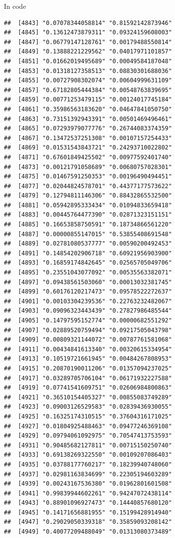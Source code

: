 \documentclass[ignorenonframetext,]{beamer}
\begin{document}
\begin{frame}[fragile]{In code}
\begin{verbatim}
##  [4843] "0.07078344058814" "0.81592142873946"
##  [4845] "0.13612473879311" "0.09324159608003"
##  [4847] "0.06779147128761" "0.00179488550814"
##  [4849] "0.13888221229562" "0.04017971101857"
##  [4851] "0.01662019495689" "0.00049584187048"
##  [4853] "0.01318127358513" "0.08830301688036"
##  [4855] "0.00727908302074" "0.00604999631109"
##  [4857] "0.67182805444384" "0.00548763839695"
##  [4859] "0.00771253479115" "0.00124017745184"
##  [4861] "0.35986563183620" "0.04647841050750"
##  [4863] "0.73151392943391" "0.00501469496461"
##  [4865] "0.07293979077776" "0.26744083374359"
##  [4867] "0.13472537251308" "0.00107157254433"
##  [4869] "0.01531543843721" "0.24293710022802"
##  [4871] "0.67601849425502" "0.00977592401740"
##  [4873] "0.00121791058689" "0.00680757028301"
##  [4875] "0.01467591250353" "0.00196490494451"
##  [4877] "0.02044824578701" "0.44377177573622"
##  [4879] "0.12794811146306" "0.88432865532500"
##  [4881] "0.05942895333434" "0.01094833659418"
##  [4883] "0.00445764477390" "0.02871323151151"
##  [4885] "0.16653858750591" "0.18734866561220"
##  [4887] "0.00000855147015" "0.53855408691548"
##  [4889] "0.02781080537777" "0.00590200492453"
##  [4891] "0.14854202906718" "0.60921956903900"
##  [4893] "0.16859174842645" "0.02565705049706"
##  [4895] "0.23551043077092" "0.00535563382071"
##  [4897] "0.09438561503060" "0.00013032381745"
##  [4899] "0.60176120217473" "0.09578522272637"
##  [4901] "0.00103304239536" "0.22763232482067"
##  [4903] "0.09096323443439" "0.27827986485544"
##  [4905] "0.14797595152774" "0.00000682551292"
##  [4907] "0.02889520759494" "0.09217505043798"
##  [4909] "0.00809321144072" "0.00787761581068"
##  [4911] "0.00434841613340" "0.00320615334954"
##  [4913] "0.10519721661945" "0.00484267808953"
##  [4915] "0.20870190011206" "0.01357094237025"
##  [4917] "0.03289705706104" "0.06171932227588"
##  [4919] "0.07741541609751" "0.02606984800863"
##  [4921] "0.36510154405327" "0.00855083749289"
##  [4923] "0.09003126529583" "0.02839436930055"
##  [4925] "0.16325174310515" "0.37604316171025"
##  [4927] "0.01804925488463" "0.09477246369108"
##  [4929] "0.09794061092975" "0.70547413753593"
##  [4931] "0.90485682127811" "0.00715150250740"
##  [4933] "0.69138269322550" "0.00109207086403"
##  [4935] "0.03788177760217" "0.18239940748060"
##  [4937] "0.02981163834699" "0.22305194603289"
##  [4939] "0.00243167536380" "0.01962801601508"
##  [4941] "0.99839944602261" "0.94247072438114"
##  [4943] "0.88901096927473" "0.14440857680120"
##  [4945] "0.14171656881955" "0.15199428914940"
##  [4947] "0.29029050339318" "0.35859093208142"
##  [4949] "0.40077209488049" "0.01313080373489"

\end{verbatim}
\end{frame}
\end{document}
